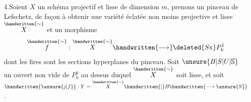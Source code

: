 4.\quad Soient $X$ un schéma projectif et lisse de dimension $m$, prenons un pinceau de Lefschetz, de façon à obtenir une variété éclatée non moins projective et lisse $\overset{\handwritten{\sim}}{X}$ et un morphisme
\[
\overset{\handwritten{\sim}}{f}:\overset{\handwritten{\sim}}{X}\handwritten{\longrightarrow}\deleted{S\mathrm{x}}P^1_k
\]
dont les fires sont les sections hyperplanes du pinceau. Soit $\unsure{B|S|U|\mathbb{S}}$ un ouvert non vide de $P^1_k$ au dessus duquel $\overset{\handwritten{\sim}}{X}$ soit lisse, et soit $\handwritten{\unsure{j|f}}:Y=\overset{\handwritten{\sim}}{X}\handwritten{|}B\handwritten{\longrightarrow\unsure{S}}$.
